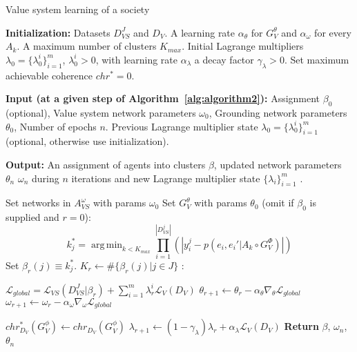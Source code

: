 \documentclass{ecai}
\newcommand{\abs}[1]{{\left|#1\right|}}
\DeclareMathOperator*{\argmin}{arg\,min}
\begin{document}
\begin{algorithm}[H]
\caption{Value system learning of a society}\label{alg:algorithm1}
\hspace*{\algorithmicindent} \textbf{Initialization:} Datasets $D_{VS}^J$ and $D_V$. A learning rate $\alpha_\theta$ for $G_V^\theta$ and $\alpha_\omega$ for every $A_k$. A maximum number of clusters $K_{max}$. Initial Lagrange multipliers $\lambda_0 = \{\lambda^i_0\}_{i=1}^m$, $\lambda^i_0 > 0$, with learning rate $\alpha_\lambda$ a decay factor $\gamma_\lambda > 0$. Set maximum achievable coherence $chr^* = 0$.%

\hspace*{\algorithmicindent} \textbf{Input (at a given step of Algorithm~\ref{alg:algorithm2}):} 
Assignment $\beta_0$ (optional), Value system network parameters $\omega_0$, Grounding network parameters $\theta_0$, Number of epochs $n$. Previous Lagrange multiplier state $\lambda_0 = \{\lambda^i_0\}_{i=1}^m$ (optional, otherwise use initialization).

\hspace*{\algorithmicindent} \textbf{Output:} An assignment of agents into clusters $\beta$, updated network parameters $\theta_n$ $\omega_n$ during $n$ iterations and new Lagrange multiplier state $\{\lambda_i\}_{i=1}^m$ .


 \begin{algorithmic}[1]
    \State Set networks in $A_{VS}^\omega$ with params $\omega_{0}$
    \State Set $G_V^\theta$ with params $\theta_{0}$
    \State {} (omit if $\beta_0$ is supplied and $r=0$):
        \State $$k^*_j = \argmin_{k<K_{max}} \prod_{i=1}^\abs{D^j_{VS}} \left(\abs{y^j_i - p(e_i,e_i'|A_k\circ G^\Phi_V)}\right)$$
        \State Set $\beta_r(j) \equiv k^*_j$.
    \EndFor
    \State $K_r \gets \#\{\beta_r(j)|j\in J\}$
    \State {}:
    
    \State $\mathcal{L}_{global} =  \mathcal{L}_{VS}(D_{VS}^J|\beta_r) + \sum_{i=1}^m\lambda^i_r \mathcal{L}_V(D_V) $
    \State $\theta_{r+1} \gets \theta_{r} - \alpha_\theta\nabla_\theta\mathcal{L}_{global}  $
    \State $\omega_{r+1} \gets \omega_{r} - \alpha_\omega\nabla_\omega\mathcal{L}_{global}  $
    
    \State $chr^*_{D_V}(G_V^\phi) \gets chr_{D_V}(G_V^\phi)$ %
    \Else 
    \State $\lambda_{r+1} \gets (1-\gamma_\lambda)\lambda_{r} + \alpha_{\lambda} \mathcal{L}_V(D_V)$
    \EndIf
    \EndFor
    \State \textbf{Return} $\beta$, $\omega_{n}$, $\theta_{n}$
\end{algorithmic}
\end{algorithm}
\end{document}
